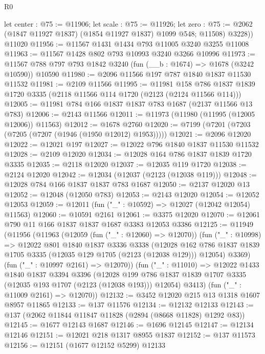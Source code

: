 \begin{lexlean}{R0}
\begin{coremodule}
        let center : @75 := @11906;
        let scale : @75 := @11926;
        let zero : @75 := @2062 (@1847 @11927 @1837) (@1854 @11927 @1837) @1099 @548; @11508)
        @3228))
    @11020
@11956 := @11567 @1431 @1434 @793 @11005 @3240 @3255 @11008
@11963 := @11567 @1428 @802 @793 @10993 @3240 @3266 @10996
@11973 := @11567 @788 @797 @793 @1842 @3240 (fun (__b : @1674) => @1678 (@3242 @10590)) @10590
@11980 := @2096 @11566 @197 @787 @1840 @1837 @11530 @11532
@11981 := @2109 @11566
@11995 := @11981
    @158
    @786
    @1837
    @1839
    @1720
    @3335
    (@2118 @11566 @114 @1720 (@2123 (@2124 @11566 @114)))
@12005 := @11981 @784 @166 @1837 @1837 @783 @1687 (@2137 @11566 @13 @783)
@12006 := @2143 @11566
@12011 := @11973 (@11980 (@11995 (@12005 @12006)) @11563)
@12012 := @1678 @2760
@12020 := @7199 (@7201 (@7203 (@7205 (@7207 (@1946 (@1950 @12012) @1953)))))
@12021 := @2096 @12020
@12022 := @12021 @197
@12027 := @12022 @796 @1840 @1837 @11530 @11532
@12028 := @2109 @12020
@12034 := @12028 @164 @786 @1837 @1839 @1720 @3335
@12035 := @2118 @12020
@12037 := @12035 @119 @1720
@12038 := @2124 @12020
@12042 := @12034 (@12037 (@2123 (@12038 @119)))
@12048 := @12028 @784 @166 @1837 @1837 @783 @1687
@12050 := @2137 @12020 @13
@12052 := @12048 (@12050 @783)
@12053 := @2143 @12020
@12054 := @12052 @12053
@12059 := @12011 (fun ("_" : @10592) => @12027 (@12042 @12054) @11563)
@12060 := @10591 @2161
@12061 := @3375 @12020
@12070 := @12061 @790 @11 @166 @1837 @1837 @1687 @3383 @12053 @3386
@12125 := @11949
    (@11956
      (@11963
        (@12059 (fun ("_" : @12060) => @12070))
        (fun ("_" : @10998) =>
        @12022
          @801
          @1840
          @1837
          @3336
          @3338
          (@12028
            @162
            @786
            @1837
            @1839
            @1705
            @3335
            (@12035 @129 @1705 (@2123 (@12038 @129)))
            @12054)
          @3369)
        (fun ("_" : @10997 @2161) => @12070))
      (fun ("_" : @11010) =>
      @12022
        @1433
        @1840
        @1837
        @3394
        @3396
        (@12028 @199 @786 @1837 @1839 @1707 @3335 (@12035 @193 @1707 (@2123 (@12038 @193))) @12054)
        @3413)
      (fun ("_" : @11009 @2161) => @12070))
@12132 := @3452 @12020 @215 @13 @1318 @1607 @8957 @11865
@12133 := @137 @11576
@12134 := @12132 @12133
@12143 := @137 (@2062 @11844 @11847 @11828 (@2894 (@8668 @11828) @1292 @83))
@12145 := @1677 @12143 @1687
@12146 := @1696 @12145
@12147 := @12134 @12146
@12151 := @12021 @218 @1317 @8955 @1837
@12152 := @137 @11573
@12156 := @12151 (@1677 @12152 @5299) @12133

\end{coremodule}
\end{lexlean}
